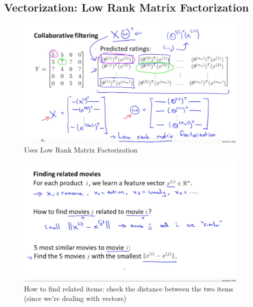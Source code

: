 \documentclass[]{article}
\begin{document}
	\subsection{Vectorization: Low Rank Matrix Factorization}

		\begin{figure}[ht!]
			\includegraphics[width= 1.5\textwidth,center]{Collaborative_Filtering.png}
			\caption{Uses Low Rank Matrix Factorization}
		\end{figure}
		\begin{figure}[ht!]
			\includegraphics[width= 1.5\textwidth,center]{Finding_Related_Movies.png}
			\caption{How to find related items: check the distance between the two items (since we're dealing with vectors)}
		\end{figure}
		
\end{document}
